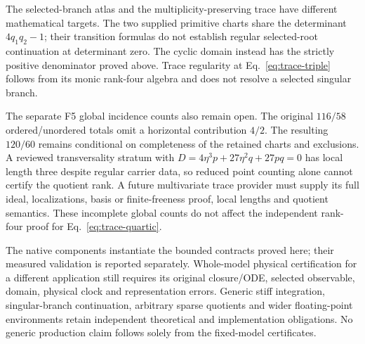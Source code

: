 The selected-branch atlas and the multiplicity-preserving trace have
different mathematical targets. The two supplied primitive charts share
the determinant $4q_1q_2-1$; their transition formulas do not establish
regular selected-root continuation at determinant zero. The cyclic domain
instead has the strictly positive denominator proved above. Trace regularity
at Eq.~\eqref{eq:trace-triple} follows from its monic rank-four algebra and
does not resolve a selected singular branch.

The separate F5 global incidence counts also remain open. The original
$116/58$ ordered/unordered totals omit a horizontal contribution $4/2$.
The resulting $120/60$ remains conditional on completeness of the retained
charts and exclusions. A reviewed transversality stratum with
$D=4\eta^3p+27\eta^2q+27pq=0$ has local length three despite regular
carrier data, so reduced point counting alone cannot certify the quotient
rank. A future multivariate trace provider must supply its full ideal,
localizations, basis or finite-freeness proof, local lengths and quotient
semantics. These incomplete global counts do not affect the independent
rank-four proof for Eq.~\eqref{eq:trace-quartic}.

The native components instantiate the bounded contracts proved here;
their measured validation is reported separately. Whole-model physical
certification for a different application still requires its original
closure/ODE, selected observable, domain, physical clock and representation
errors. Generic stiff integration, singular-branch continuation, arbitrary
sparse quotients and wider floating-point environments retain independent
theoretical and implementation obligations. No generic production claim
follows solely from the fixed-model certificates.
